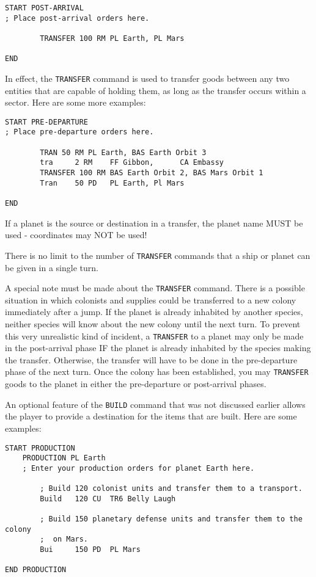 \documentclass[10pt,titlepage]{article}
\begin{document}
\begin{verbatim}
START POST-ARRIVAL
; Place post-arrival orders here.

        TRANSFER 100 RM PL Earth, PL Mars

END
\end{verbatim} 

In effect, the \texttt{TRANSFER} command is used to transfer goods between any two
entities that are capable of holding them, as long as the transfer occurs
within a sector.  Here are some more examples:

\begin{verbatim}
START PRE-DEPARTURE
; Place pre-departure orders here.

        TRAN 50 RM PL Earth, BAS Earth Orbit 3
        tra     2 RM    FF Gibbon,      CA Embassy
        TRANSFER 100 RM BAS Earth Orbit 2, BAS Mars Orbit 1
        Tran    50 PD   PL Earth, Pl Mars

END
\end{verbatim} 

If a planet is the source or destination in a transfer, the planet name MUST
be used - coordinates may NOT be used!

There is no limit to the number of \texttt{TRANSFER} commands that a ship or planet can
be given in a single turn.

A special note must be made about the \texttt{TRANSFER} command.  There is a possible
situation in which colonists and supplies could be transferred to a new colony
immediately after a jump.  If the planet is already inhabited by another
species, neither species will know about the new colony until the next turn.
To prevent this very unrealistic kind of incident, a \texttt{TRANSFER} to a planet may
only be made in the post-arrival phase IF the planet is already inhabited by
the species making the transfer.  Otherwise, the transfer will have to be
done in the pre-departure phase of the next turn.  Once the colony has been
established, you may \texttt{TRANSFER} goods to the planet in either the pre-departure
or post-arrival phases.

An optional feature of the \texttt{BUILD} command that was not discussed earlier allows
the player to provide a destination for the items that are built.  Here are
some examples:

\begin{verbatim}
START PRODUCTION
    PRODUCTION PL Earth
    ; Enter your production orders for planet Earth here.

        ; Build 120 colonist units and transfer them to a transport.
        Build   120 CU  TR6 Belly Laugh

        ; Build 150 planetary defense units and transfer them to the colony
        ;  on Mars.
        Bui     150 PD  PL Mars

END PRODUCTION
\end{verbatim} 
\end{document}
